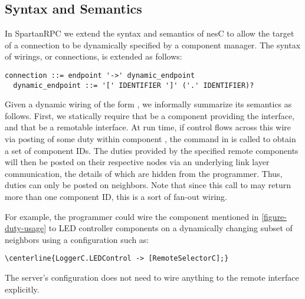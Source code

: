 \subsection{Syntax and Semantics}
\label{section-wiringsyntax}

In SpartanRPC we extend the syntax and semantics of nesC to allow the
target of a connection to be dynamically specified by a component
manager. The syntax of wirings, or connections, is extended as follows:

\begin{lrbox}{\savebigbox}
\begin{minipage}{4.3in}
\vspace{0.6em}
\begin{Verbatim}[fontsize=\small]
        connection ::= endpoint '->' dynamic_endpoint
  dynamic_endpoint ::= '[' IDENTIFIER ']' ('.' IDENTIFIER)?
\end{Verbatim}
\vspace{0.3em}
\end{minipage}
\end{lrbox}
\centerline{\usebox{\savebigbox}}

Given a dynamic wiring of the form , we informally
summarize its semantics as follows. First, we statically require that
 be a component providing the  interface,
and that  be a remotable interface. At run time, if control
flows across this wire via posting of some duty  within
component , the command  in  is called to
obtain a set of component IDs. The duties  provided by the
specified remote components will then be posted on their respective
nodes via an underlying link layer communication, the details of which
are hidden from the programmer. Thus, duties can only be posted on
neighbors. Note that since this call to  may return more
than one component ID, this is a sort of fan-out wiring.

For example, the programmer could wire the  component
mentioned in \autoref{figure-duty-usage} to LED controller components on
a dynamically changing subset of neighbors using a configuration such
as:
\begin{Verbatim}[fontsize=\small, commandchars=\\\{\}]
\centerline{LoggerC.LEDControl -> [RemoteSelectorC];}
\end{Verbatim}

The server's configuration does not need to wire anything to the remote
interface explicitly.

